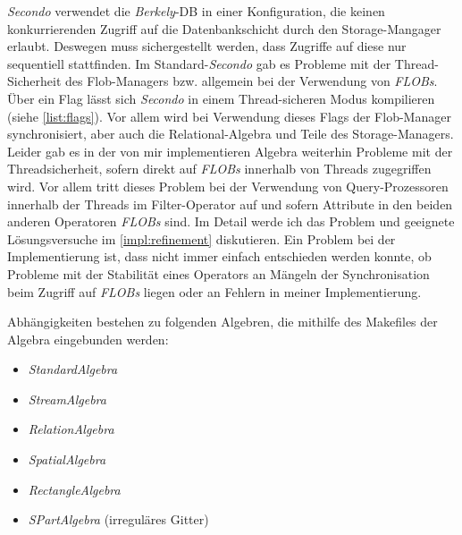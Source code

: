\documentclass[a4paper,12pt,twoside]{article}
\newcommand{\Fb}[1]{\textit{#1}} %
\begin{document}
\Fb{Secondo} verwendet die \Fb{Berkely}-DB in einer Konfiguration, die keinen konkurrierenden Zugriff auf die Datenbankschicht durch den Storage-Mangager erlaubt. Deswegen muss sichergestellt werden, dass Zugriffe auf diese nur sequentiell stattfinden. Im Standard-\Fb{Secondo} gab es Probleme mit der Thread-Sicherheit des Flob-Managers bzw. allgemein bei der Verwendung von \Fb{FLOBs}. Über ein Flag lässt sich \Fb{Secondo} in einem Thread-sicheren Modus kompilieren (siehe \autoref{list:flags}). Vor allem wird bei Verwendung dieses Flags der Flob-Manager synchronisiert, aber auch die Relational-Algebra und Teile des Storage-Managers. Leider gab es in der von mir implementieren Algebra weiterhin Probleme mit der Threadsicherheit, sofern direkt auf \Fb{FLOBs} innerhalb von Threads zugegriffen wird. Vor allem tritt dieses Problem bei der Verwendung von Query-Prozessoren innerhalb der Threads im Filter-Operator auf und sofern Attribute in den beiden anderen Operatoren \Fb{FLOBs} sind. Im Detail werde ich das Problem und geeignete Lösungsversuche im \autoref{impl:refinement} diskutieren. Ein Problem bei der Implementierung ist, dass nicht immer einfach entschieden werden konnte, ob Probleme mit der Stabilität eines Operators an Mängeln der Synchronisation beim Zugriff auf \Fb{FLOBs} liegen oder an Fehlern in meiner Implementierung.

Abhängigkeiten bestehen zu folgenden Algebren, die mithilfe des Makefiles der Algebra eingebunden werden:

\begin{itemize}
	\item \Fb{StandardAlgebra}
	\item \Fb{StreamAlgebra}
	\item \Fb{RelationAlgebra}
	\item \Fb{SpatialAlgebra}
	\item \Fb{RectangleAlgebra}
	\item \Fb{SPartAlgebra} (irreguläres Gitter)
\end{itemize}
\end{document}
